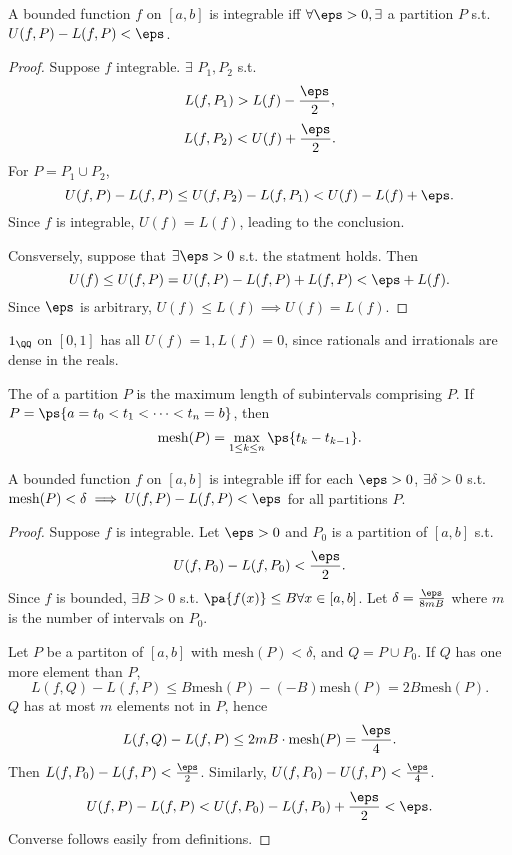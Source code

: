\documentclass[11pt]{scrartcl}
\numberwithin{equation}{section}
\begin{document}
\begin{theorem}
    A bounded function $f$ on $[a,b]$ is integrable iff $\forall \eps>0, \exists$ a partition $P$ s.t. $U(f,P)-L(f,P)<\eps$. 
\end{theorem}
\begin{proof}
    Suppose $f$ integrable. $\exists$ $P_1,P_2$ s.t. 
    \[
        L(f,P_1) > L(f)-\frac{\eps}{2},
    \]
    \[
        L(f,P_2) < U(f)+\frac{\eps}{2}.
    \]
    For $P = P_1\cup P_2$, 
    \[
        U(f,P)-L(f,P) \leq U(f,P_2)-L(f,P_1) < U(f) - L(f) + \eps.
    \]
    Since $f$ is integrable, $U(f) = L(f)$, leading to the conclusion.

    Consversely, suppose that $\exists \eps>0$ s.t. the statment holds.
    Then 
    \[
        U(f) \leq U(f,P) = U(f,P) - L(f,P) + L(f,P) < \eps + L(f).
    \]
    Since $\eps$ is arbitrary, $U(f)\leq L(f)\implies U(f)=L(f)$.
\end{proof}
\begin{example}
    $1_\QQ$ on $[0,1]$ has all $U(f) = 1, L(f) = 0$, since rationals and irrationals are dense in the reals.
\end{example}
\begin{definition}
    The  of a partition $P$ is the maximum length 
    of subintervals comprising $P$.
    If $P = \ps{a=t_0<t_1<\cdots< t_n =b}$, then 
    \[ \mathrm{mesh}(P) = \max_{1\leq k\leq n}\ps{t_k-t_{k-1}}. \]
\end{definition}
\begin{theorem}
    \label{thm:darbouxdeltaeps}
    A bounded function $f$ on $[a,b]$ is integrable iff 
    for each $\eps>0$, $\exists \delta>0$ s.t. 
    $\mathrm{mesh}(P)<\delta\implies U(f,P)-L(f,P)<\eps$ for all 
    partitions $P$.
\end{theorem}
\begin{proof}
    Suppose $f$ is integrable. Let $\eps>0$ and $P_0$ is a partition of $[a,b]$ s.t. 
    \[
        U(f,P_0) - L(f,P_0) < \frac{\eps}{2}.
    \]
    Since $f$ is bounded, $\exists B>0$ s.t. $\pa{f(x)} \leq B \forall x\in[a,b]$. Let $\delta = \frac{\eps}{8mB}$ where $m$ is the number 
    of intervals on $P_0$.

    Let $P$ be a partiton of $[a,b]$ with $\mathrm{mesh}(P)<\delta$, and $Q = P\cup P_0$. If $Q$ has one more element than $P$,
    \[
        L(f,Q) - L(f,P) \leq B \mathrm{mesh}(P) - (-B)\mathrm{mesh}(P) = 2B \mathrm{mesh}(P).
    \]
    $Q$ has at most $m$ elements not in $P$, hence 
    \[
        L(f,Q) - L(f,P) \leq2mB\cdot\mathrm{mesh}(P) = \frac{\eps}{4}.
    \]
    Then $L(f,P_0)-L(f,P)<\frac{\eps}{2}$. Similarly, $U(f,P_0)-U(f,P)<\frac{\eps}{4}$. 
    \[
        U(f,P)-L(f,P) < U(f,P_0)-L(f,P_0) + \frac{\eps}{2} < \eps.
    \]
    Converse follows easily from definitions.
\end{proof}
\end{document}
